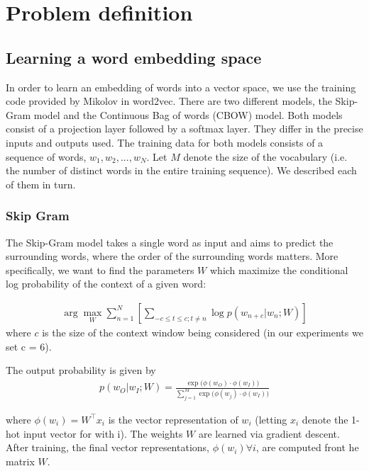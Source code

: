 
\section{Problem definition}

\subsection{Learning a word embedding space}

In order to learn an embedding of words into a vector space, we use the training code provided by Mikolov \etal in word2vec\cite{word2vec}. There are two different models, the Skip-Gram model and the Continuous Bag of words (CBOW) model. Both models consist of a projection layer followed by a softmax layer. They differ in the precise inputs and outputs used. The training data for both models consists of a sequence of words, $w_1, w_2, ..., w_N$. Let $M$ denote the size of the vocabulary (i.e. the number of distinct words in the entire training sequence). We described each of them in turn. 

\subsubsection{Skip Gram}
The Skip-Gram model takes a single word as input and aims to predict the surrounding words, where the order of the surrounding words matters. More specifically, we want to find the parameters $W$ which maximize the conditional log probability of the context of a given word:

\begin{align*}
	\arg \max_{W} \sum_{n=1}^{N} [\sum_{-c \leq t \leq c; t \neq n} \log p(w_{n+c} | w_n; W)]
\end{align*}
where $c$ is the size of the context window being considered (in our experiments we set c = 6). 

The output probability is given by
\begin{align*}
p(w_{O} | w_{I}; W) = \frac{ \exp \big(\phi(w_O) \cdot \phi(w_I) \big)}{\sum_{j=1}^M \exp \big(\phi(w_j) \cdot \phi(w_I) \big)}
\end{align*}


where $\phi(w_i) = W^{\top}x_i$ is the vector representation of $w_i$ (letting $x_i$ denote the 1-hot input vector for with i). The weights $W$ are learned via gradient descent. After training, the final vector representations, $\phi(w_i) \forall i$, are computed front he matrix $W$.



